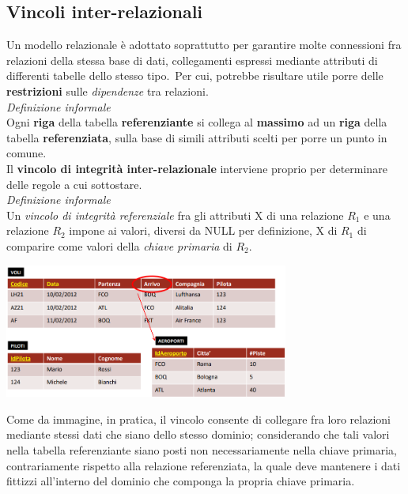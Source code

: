 \documentclass{article}
\begin{document}
\subsection*{Vincoli inter-relazionali}
\large
Un modello relazionale è adottato soprattutto per garantire molte connessioni fra relazioni della stessa base di dati, collegamenti espressi mediante attributi di differenti tabelle dello stesso tipo.\ Per cui, potrebbe risultare utile porre delle \textbf{restrizioni} sulle \textit{dipendenze} tra relazioni.\vspace{14pt}\\
\textit{Definizione informale}\\Ogni \textbf{riga} della tabella \textbf{referenziante} si collega al \textbf{massimo} ad un \textbf{riga} della tabella \textbf{referenziata}, sulla base di simili attributi scelti per porre un punto in comune.\vspace{14pt}\\
Il \textbf{vincolo di integrità inter-relazionale} interviene proprio per determinare delle regole a cui sottostare.\vspace{14pt}\\
\textit{Definizione informale}\\Un \textit{vincolo di integrità referenziale} fra gli attributi X di una relazione $R_1$ e una relazione $R_2$ impone ai valori, diversi da NULL per definizione, X di $R_1$ di comparire come valori della \textit{chiave primaria} di $R_2$.
\begin{center}
    \includegraphics[width = 0.7\textwidth]{foto 5.png}
\end{center}
Come da immagine, in pratica, il vincolo consente di collegare fra loro relazioni mediante stessi dati che siano dello stesso dominio; considerando che tali valori nella tabella referenziante siano posti non necessariamente nella chiave primaria, contrariamente rispetto alla relazione referenziata, la quale deve mantenere i dati fittizzi all'interno del dominio che componga la propria chiave primaria.\vspace{14pt}\\
\end{document}

